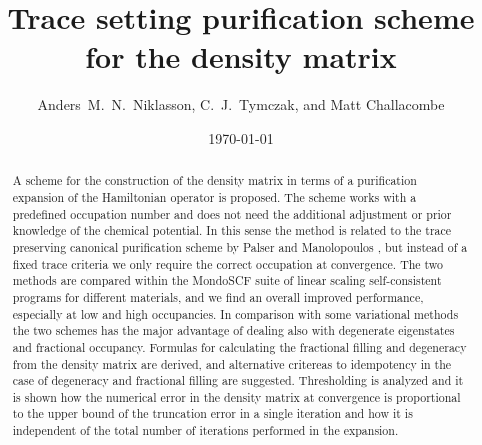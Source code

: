 \commentoutA{\documentclass[superbib,aps,prb,epsfig,floats,twocolumn]{revtex4}}
\begin{document}





\date{\today}

\title{Trace setting purification scheme for the density matrix}

\author{Anders~M.~N.~Niklasson, C.~J.~Tymczak, and Matt Challacombe}

\address{
Theoretical Division, Los Alamos National Laboratory,
Los Alamos, NM 87545, USA}


\begin{abstract}
A scheme for the construction of the density matrix in terms of
a purification expansion of the Hamiltonian operator is proposed. The scheme
works with a predefined occupation number and does not need
the additional adjustment or prior knowledge of the chemical potential.
In this sense the method is related to the trace preserving canonical 
purification scheme by Palser and Manolopoulos \cite{McWeeny60,Palser98}, 
but instead of a fixed trace criteria we only require the correct
occupation at convergence. The two methods are
compared within the MondoSCF suite of linear scaling self-consistent
programs for different materials, and we find an overall improved performance,
especially at low and high occupancies. In comparison
with some variational methods the two schemes has the major advantage of
dealing also with degenerate eigenstates and fractional occupancy. 
Formulas for calculating the fractional filling and degeneracy from 
the density matrix are derived, and alternative critereas to idempotency
in the case of degeneracy and fractional filling are suggested.
Thresholding is analyzed and it is shown how the numerical error 
in the density matrix at convergence is proportional to the upper bound of 
the truncation error in a single iteration and how it is independent of the total 
number of iterations performed in the expansion. 


\end{abstract}

\maketitle
\end{document}
